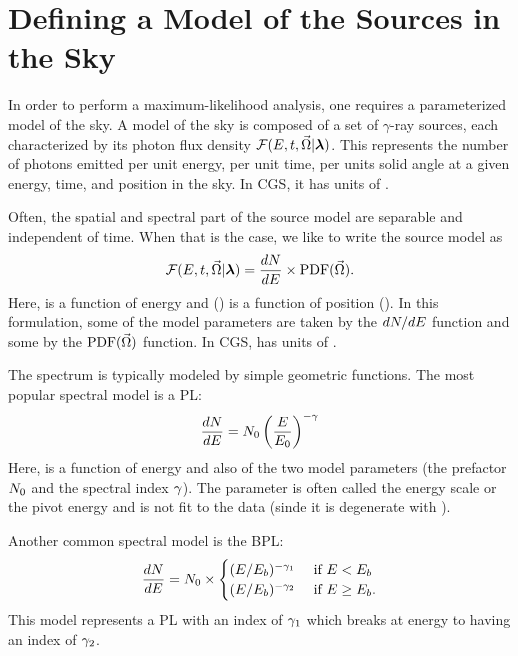 \section{Defining a Model of the Sources in the Sky}

In order to perform a maximum-likelihood analysis, one requires a
parameterized model of the sky. A model of the sky is composed of a set
of $\gamma$-ray sources, each characterized by its photon flux density
$\mathcal{F}(E,t,\vec\Omega|\boldsymbol{\lambda})$.  This represents
the number of photons emitted per unit energy, per unit time, per
units solid angle at a given energy, time, and position in the sky.
In \ac{CGS}, it has units of \fluxdensityunits.

Often, the spatial and spectral part of the source model are separable
and independent of time. When that is the case, we like to write the
source model as
\begin{equation}
  \mathcal{F}(E,t,\vec\Omega|\boldsymbol{\lambda}) = \frac{dN}{dE} \times \text{PDF}(\vec\Omega).
\end{equation}
Here, \dndeinline is a function of energy and \pdf(\solidangle) is 
a function of position (\solidangle).  In this formulation, some of
the model parameters \modelparams are taken by the $dN/dE$ function and
some by the $\text{PDF}(\vec\Omega)$ function.  In \ac{CGS}, \dndeinline has units
of \prefunits.

The spectrum \dndeinline is typically modeled by simple geometric functions.
The most popular spectral model is a \ac{PL}:
\begin{equation}
  \frac{dN}{dE} = N_0 \left(\frac{E}{E_0}\right)^{-\gamma}
\end{equation}
Here, \dndeinline is a function of energy and also of the two model parameters
(the prefactor $N_0$ and the spectral index $\gamma$). The
parameter \Escale is often called the energy scale or the pivot energy
and is not fit to the data (sinde it is degenerate with \prefactor).

Another common spectral model is the \ac{BPL}:
\begin{equation}
  \frac{dN}{dE} = N_0 \times
    \begin{cases}
      (E/E_b)^{-\gamma_1} &\text{ if }E<E_b \\
      (E/E_b)^{-\gamma_2} &\text{ if }E\ge E_b.
    \end{cases}
\end{equation}
This model represents a \ac{PL} with an index of $\gamma_1$ which
breaks at energy \Ebreak to having an index of $\gamma_2$.

